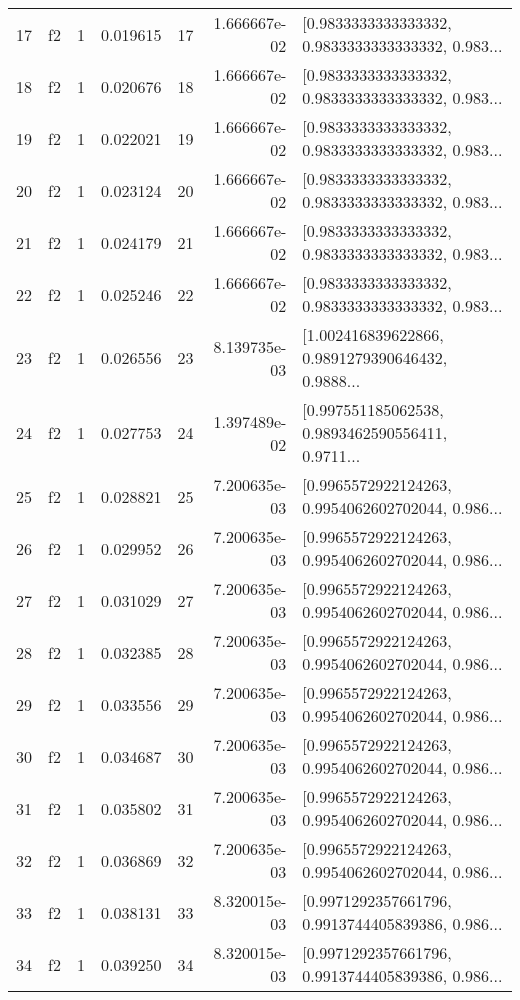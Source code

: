 \begin{tabular}{lllrlrl}
17  &  f2 &   1 &  0.019615 &   17 &  1.666667e-02 &  [0.9833333333333332, 0.9833333333333332, 0.983... \\
18  &  f2 &   1 &  0.020676 &   18 &  1.666667e-02 &  [0.9833333333333332, 0.9833333333333332, 0.983... \\
19  &  f2 &   1 &  0.022021 &   19 &  1.666667e-02 &  [0.9833333333333332, 0.9833333333333332, 0.983... \\
20  &  f2 &   1 &  0.023124 &   20 &  1.666667e-02 &  [0.9833333333333332, 0.9833333333333332, 0.983... \\
21  &  f2 &   1 &  0.024179 &   21 &  1.666667e-02 &  [0.9833333333333332, 0.9833333333333332, 0.983... \\
22  &  f2 &   1 &  0.025246 &   22 &  1.666667e-02 &  [0.9833333333333332, 0.9833333333333332, 0.983... \\
23  &  f2 &   1 &  0.026556 &   23 &  8.139735e-03 &  [1.002416839622866, 0.9891279390646432, 0.9888... \\
24  &  f2 &   1 &  0.027753 &   24 &  1.397489e-02 &  [0.997551185062538, 0.9893462590556411, 0.9711... \\
25  &  f2 &   1 &  0.028821 &   25 &  7.200635e-03 &  [0.9965572922124263, 0.9954062602702044, 0.986... \\
26  &  f2 &   1 &  0.029952 &   26 &  7.200635e-03 &  [0.9965572922124263, 0.9954062602702044, 0.986... \\
27  &  f2 &   1 &  0.031029 &   27 &  7.200635e-03 &  [0.9965572922124263, 0.9954062602702044, 0.986... \\
28  &  f2 &   1 &  0.032385 &   28 &  7.200635e-03 &  [0.9965572922124263, 0.9954062602702044, 0.986... \\
29  &  f2 &   1 &  0.033556 &   29 &  7.200635e-03 &  [0.9965572922124263, 0.9954062602702044, 0.986... \\
30  &  f2 &   1 &  0.034687 &   30 &  7.200635e-03 &  [0.9965572922124263, 0.9954062602702044, 0.986... \\
31  &  f2 &   1 &  0.035802 &   31 &  7.200635e-03 &  [0.9965572922124263, 0.9954062602702044, 0.986... \\
32  &  f2 &   1 &  0.036869 &   32 &  7.200635e-03 &  [0.9965572922124263, 0.9954062602702044, 0.986... \\
33  &  f2 &   1 &  0.038131 &   33 &  8.320015e-03 &  [0.9971292357661796, 0.9913744405839386, 0.986... \\
34  &  f2 &   1 &  0.039250 &   34 &  8.320015e-03 &  [0.9971292357661796, 0.9913744405839386, 0.986... \\

\end{tabular}
